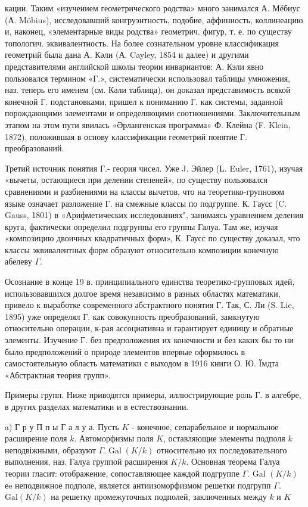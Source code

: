 \documentclass[10pt]{article}
\begin{document}
кации. Таким «изучением геометрического родства» много занимался А. Мёбиус (А. Möbius), исследовавший конгруэнтность, подобие, аффинность, коллинеацию и, наконец, «элементарные виды родства» геометрич. фигур, т. е. по существу топологич. эквивалентность. На более сознательном уровне классификация геометрий была дана А. Кәли (А. Cayley, 1854 и далее) и другими представителями английской школы теории инвариантов: А. Кэли явно пользовался термином «Г.», систематически использовал таблицы умножения, наз. теперь его именем (см. Кәли таблица), он доказал представимость всякой конечной Г. подстановками, пришел к пониманию Г. как системы, заданной порождающими элементами и определяюцими соотношениями. Заключительным этапом на этом пути явилась «Әрлангенская программа» Ф. Клейна (F. Klein, 1872), положившая в основу классификации геометрий понятие Г. преобразований.



Третий источник понятия Г.- геория чисел. Уже J. Эйлер (L. Euler, 1761), изучая «вычеты, остающиеся при делении степеней», по существу пользовался сравнениями и разбиениями на классы вычетов, что на теоретико-групновом языке означает разложение Г. на смежные классы по подгруппе. К. Гаусс (C. Gauss, 1801) в «Арифметических исследованиях", занимаясь уравнением деления круга, фактически определил подгруппы его группы Галуа. Там же, изучая «композицию двоичных квадратичных форм», К. Гаусс по существу доказал, что классы эквивалентных форм образуют относительно композиции конечную абелеву $\Gamma$.



Осознание в конце 19 в. принципиального единства теоретико-групповых идей, использовавшихся долгое время независимо в разных областях математики, привело к выработке современного абстрактного понятия Г. Так, С. Ли (S. Lie, 1895) уже определял Г. как совокупность преобразований, замкнутую относительно операции, к-рая ассоциативна и гарантирует единицу и обратные элементы. Изучение Г. без предположения их конечности и без каких бы то ни было предположений о природе элементов впервые оформилось в самостоятельную область математики с выходом в 1916 книги О. Ю. Ïмдта «Абстрактная теория групп».



Примеры групп. Ниже приводятся примеры, иллюстрирующие роль Г. в алгебре, в других разделах математики и в естествознании.



a) Г р у П п ы $Г$ а л у а. Пусть $K$ - конечное, сепарабельное и нормальное расширение поля $k$. Автоморфизмы поля $K$, оставляющие элементы подполя $k$ неподвіжными, образуют $\Gamma . \operatorname{Gal}(K / k)$ относительно их последовательного выполнения, наз. Галуа группой расширения $K / k$. Основная теорема Галуа теории гласит: отображение, сопоставляющее каждой подгруппе $\Gamma$. Gal $(K / k)$ еe неподвижное подполе, является антиизоморфизмом решетки подгрупп $\Gamma$. $\mathrm{Gal}(K / k)$ на решетку промежуточных подполей, заключенных между $k$ и $K$
\end{document}
